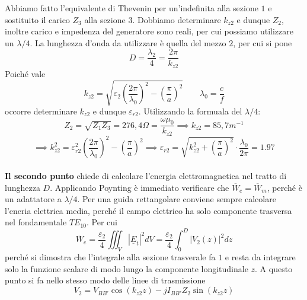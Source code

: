 \documentclass{book}
\begin{document}
    Abbiamo fatto l'equivalente di Thevenin per un'indefinita alla sezione $1$ e sostituito il carico $Z_{3}$ alla sezione $3$. Dobbiamo determinare $k_{z2}$ e dunque $Z_{2}$, inoltre carico e impedenza del generatore 
    sono reali, per cui possiamo utilizzare un $\lambda/4$. La lunghezza d'onda da utilizzare è quella del mezzo $2$, per cui si pone
    \begin{equation}
        D = \frac{\lambda_{2}}{4} = \frac{2 \pi}{k_{z2}}
    \end{equation} 
    Poiché vale
    \begin{equation}
        k_{z2} = \sqrt{\varepsilon_{2}(\frac{2 \pi}{\lambda_{0}}) ^{2} - (\frac{\pi}{a})^{2}} \qquad \lambda_{0} = \frac{c}{f}     
    \end{equation}
    occorre determinare $k_{z2}$ e dunque $\varepsilon_{r2}$. Utilizzando la formuala del $\lambda/4$:
    \begin{equation}
        Z_{2} = \sqrt{Z_{1}Z_{3}} = 276,4 \Omega = \frac{\omega \mu_{0}}{k_{z2}} \implies k_{z2} = 85,7 m^{-1}
    \end{equation}
    \begin{equation}
        \implies k_{z2} ^{2} = \varepsilon_{r2} ^{2}(\frac{2\pi}{\lambda_{0}})^{2}-(\frac{\pi}{a})^{2} \implies \varepsilon_{r2} = \sqrt{k_{z2} ^{2} + (\frac{\pi}{a})^{2}} \cdot \frac{\lambda_{0}}{2 \pi} = 1.97
    \end{equation} \\
    \textbf{Il secondo punto} chiede di calcolare l'energia elettromagnetica nel tratto di lunghezza $D$. Applicando Poynting è immediato verificare che $\overline{W}_{e}=\overline{W}_{m}$, perché 
    è un adattatore a $\lambda/4$. Per una guida rettangolare conviene sempre calcolare l'eneria elettrica media, perché il campo elettrico ha solo componente trasversa nel fondamentale $TE_{10}$.
    Per cui
    \begin{equation}
        \overline{W}_{e} = \frac{\varepsilon_{2}}{4} \iiint_{V} |\underline{E}_{t}| ^{2} dV = \frac{\varepsilon_{2}}{4} \int_{0} ^{D} |V_{2}(z)|^{2} dz
    \end{equation}
    perché si dimostra che l'integrale alla sezione trasverale fa $1$ e resta da integrare solo la funzione scalare di modo lungo la componente longitudinale $z$.
    A questo punto si fa nello stesso modo delle linee di trasmissione
    \begin{equation}
        V_{2} = V_{BB'}\cos(k_{z2}z)-jI_{BB'}Z_{2}\sin(k_{z2}z)
    \end{equation}
\end{document}
